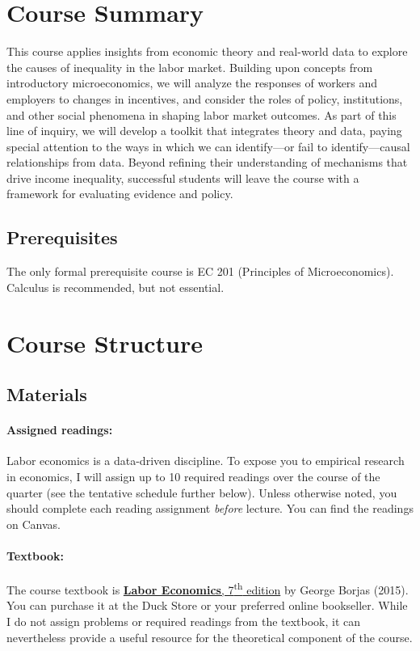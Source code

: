 \documentclass[11pt]{article}
\begin{document}
\section*{Course Summary}

This course applies insights from economic theory and real-world data to explore the causes of inequality in the labor market. Building upon concepts from introductory microeconomics, we will analyze the responses of workers and employers to changes in incentives, and consider the roles of policy, institutions, and other social phenomena in shaping labor market outcomes. As part of this line of inquiry, we will develop a toolkit that integrates theory and data, paying special attention to the ways in which we can identify---or fail to identify---causal relationships from data. Beyond refining their understanding of mechanisms that drive income inequality, successful students will leave the course with a framework for evaluating evidence and policy.

\subsection*{Prerequisites} 

The only formal prerequisite course is EC 201 (Principles of Microeconomics). Calculus is recommended, but not essential.

\section*{Course Structure}

\subsection*{Materials} 

\paragraph*{Assigned readings:} Labor economics is a data-driven discipline. To expose you to empirical research in economics, I will assign up to 10 required readings over the course of the quarter (see the tentative schedule further below). Unless otherwise noted, you should complete each reading assignment \textit{before} lecture. You can find the readings on Canvas.

\paragraph*{Textbook:} The course textbook is \href{https://www.amazon.com/Labor-Economics-George-J-Borjas/dp/007802188X}{\textbf{Labor Economics}, 7\textsuperscript{th} edition} by George Borjas (2015). You can purchase it at the Duck Store or your preferred online bookseller. While I do not assign problems or required readings from the textbook, it can nevertheless provide a useful resource for the theoretical component of the course.
\end{document}
